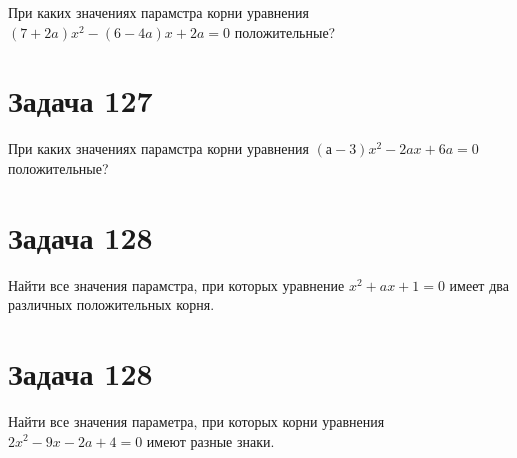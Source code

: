 \documentclass[a4paper,12pt]{article}
\begin{document}
При каких значениях парамстра корни уравнения
$(7 + 2a)x^2 - (6 - 4a)x + 2a = 0$ положительные?

\section{Задача 127}

При каких значениях парамстра корни уравнения
$(а - 3)x^2 - 2ax + 6a = 0$ положительные?

\section{Задача 128}

Найти все значения парамстра, при которых уравнение
$x^2 + ax + 1 = 0$ имеет два различных положительных корня.

\section{Задача 128}

Найти все значения параметра, при которых корни уравнения
$2x^2 - 9x - 2a + 4 = 0$ имеют разные знаки.
\end{document}
